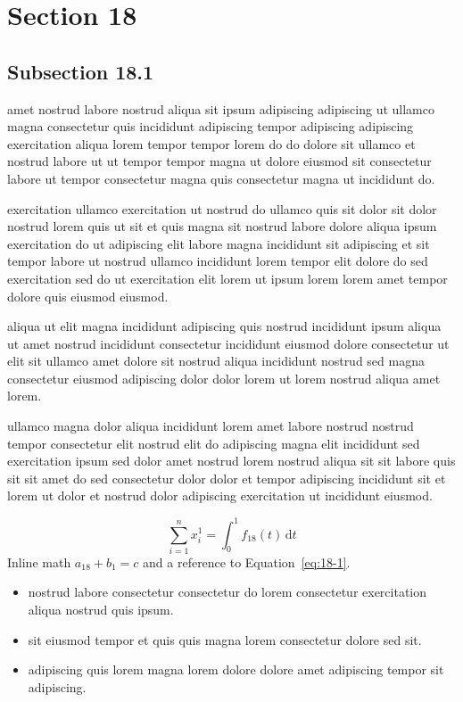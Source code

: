 \documentclass{article}
\begin{document}
\section{Section 18}\label{sec:18}
\subsection{Subsection 18.1}\label{sec:18-1}
amet nostrud labore nostrud aliqua sit ipsum adipiscing adipiscing ut ullamco magna consectetur quis incididunt adipiscing tempor adipiscing adipiscing exercitation aliqua lorem tempor tempor lorem do do dolore sit ullamco et nostrud labore ut ut tempor tempor magna ut dolore eiusmod sit consectetur labore ut tempor consectetur magna quis consectetur magna ut incididunt do.

exercitation ullamco exercitation ut nostrud do ullamco quis sit dolor sit dolor nostrud lorem quis ut sit et quis magna sit nostrud labore dolore aliqua ipsum exercitation do ut adipiscing elit labore magna incididunt sit adipiscing et sit tempor labore ut nostrud ullamco incididunt lorem tempor elit dolore do sed exercitation sed do ut exercitation elit lorem ut ipsum lorem lorem amet tempor dolore quis eiusmod eiusmod.

aliqua ut elit magna incididunt adipiscing quis nostrud incididunt ipsum aliqua ut amet nostrud incididunt consectetur incididunt eiusmod dolore consectetur ut elit sit ullamco amet dolore sit nostrud aliqua incididunt nostrud sed magna consectetur eiusmod adipiscing dolor dolor lorem ut lorem nostrud aliqua amet lorem.

ullamco magna dolor aliqua incididunt lorem amet labore nostrud nostrud tempor consectetur elit nostrud elit do adipiscing magna elit incididunt sed exercitation ipsum sed dolor amet nostrud lorem nostrud aliqua sit sit labore quis sit sit amet do sed consectetur dolor dolor et tempor adipiscing incididunt sit et lorem ut dolor et nostrud dolor adipiscing exercitation ut incididunt eiusmod.

\begin{equation}\label{eq:18-1}
  \sum_{i=1}^{n} x_i^{1} = \int_0^1 f_{18}(t)\,\mathrm{d}t
\end{equation}
Inline math $a_{18} + b_{1} = c$ and a reference to Equation~\eqref{eq:18-1}.

\begin{itemize}
  \item nostrud labore consectetur consectetur do lorem consectetur exercitation aliqua nostrud quis ipsum.
  \item sit eiusmod tempor et quis quis magna lorem consectetur dolore sed sit.
  \item adipiscing quis lorem magna lorem dolore dolore amet adipiscing tempor sit adipiscing.
\end{itemize}
\end{document}
